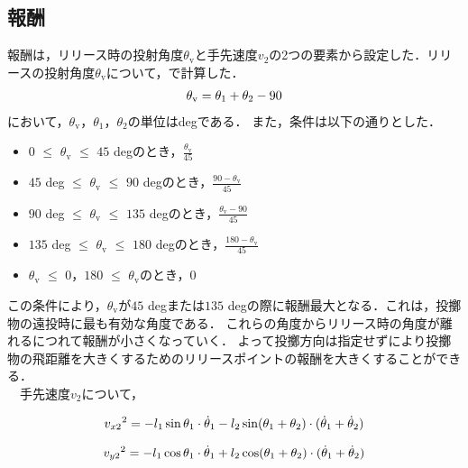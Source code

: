 \subsection{報酬}
報酬は，リリース時の投射角度$\theta_{\mathrm{v}}$と手先速度$v_{2}$の2つの要素から設定した．リリースの投射角度$\theta_{\mathrm{v}}$について，で計算した．
\begin{eqnarray}
  \equlabel{2.19}
  \theta_{\mathrm{v}}=\theta_{1}+\theta_{2}-90
\end{eqnarray}
において，$\theta_{\mathrm{v}}$，$\theta_{1}$，$\theta_{2}$の単位はdegである．
また，条件は以下の通りとした．\\
\begin{itemize}
  \item $0$ $\le$ $\theta_{\mathrm{v}}$ $\le$ $45$ degのとき，$\frac{\theta_{\mathrm{v}}}{45}$
  \item $45$ deg $\le$ $\theta_{\mathrm{v}}$ $\le$ $90$ degのとき，$\frac{90-\theta_{\mathrm{v}}}{45}$
  \item $90$ deg $\le$ $\theta_{\mathrm{v}}$ $\le$ $135$ degのとき，$\frac{\theta_{\mathrm{v}}-90}{45}$
  \item $135$ deg $\le$ $\theta_{\mathrm{v}}$ $\le$ $180$ degのとき，$\frac{180-\theta_{\mathrm{v}}}{45}$
  \item $\theta_{\mathrm{v}}$ $\le$ $0$，$180$ $\le$ $\theta_{\mathrm{v}}$のとき，$0$\\
\end{itemize}

この条件により，$\theta_{\mathrm{v}}$が$45$ degまたは$135$ degの際に報酬最大となる．これは，投擲物の遠投時に最も有効な角度\cite{angle}である．
これらの角度からリリース時の角度が離れるにつれて報酬が小さくなっていく．
よって投擲方向は指定せずにより投擲物の飛距離を大きくするためのリリースポイントの報酬を大きくすることができる．\\
　手先速度$v_{2}$について，

\begin{eqnarray}
  \equlabel{2.20}
  {v_{x2}}^2=-l_{1}\sin\theta_{1}\cdot\dot{\theta}_{1}-l_2\sin(\theta_{1}+\theta_{2})\cdot(\dot{\theta}_{1}+\dot{\theta}_{2})
\end{eqnarray}

\begin{eqnarray}
  \equlabel{2.21}
  {v_{y2}}^2=-l_{1}\cos\theta_{1}\cdot\dot{\theta}_{1}+l_2\cos(\theta_{1}+\theta_{2})\cdot(\dot{\theta}_{1}+\dot{\theta}_{2})
\end{eqnarray}

